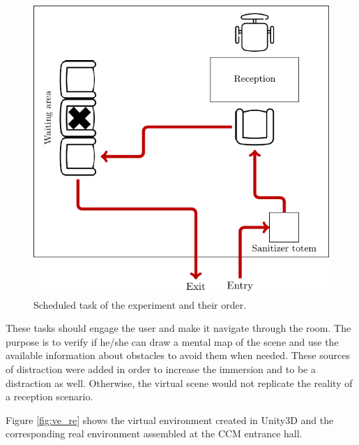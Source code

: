         \begin{figure}[H]
            \includegraphics[width = \linewidth]{Metodologia/caminho.pdf}
            \caption{Scheduled task of the experiment and their order.}
            \label{fig:task_diagram}
        \end{figure}
        
        These tasks should engage the user and make it navigate through the room. The purpose is to verify if he/she can draw a mental map of the scene and use the available information about obstacles to avoid them when needed. These sources of distraction were added in order to increase the immersion and to be a distraction as well. Otherwise, the virtual scene would not replicate the reality of a reception scenario.

        Figure \ref{fig:ve_re} shows the virtual environment created in Unity3D and the corresponding real environment assembled at the CCM entrance hall. 
    
